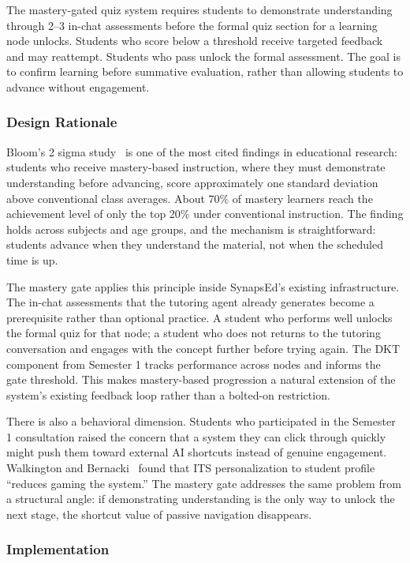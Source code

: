 \documentclass{stylefiles/capstone}
\begin{document}
The mastery-gated quiz system requires students to demonstrate understanding through 2--3 in-chat assessments before the formal quiz section for a learning node unlocks. Students who score below a threshold receive targeted feedback and may reattempt. Students who pass unlock the formal assessment. The goal is to confirm learning before summative evaluation, rather than allowing students to advance without engagement.

\subsubsection{Design Rationale}

Bloom's 2 sigma study~\cite{bloom1984sigma} is one of the most cited findings in educational research: students who receive mastery-based instruction, where they must demonstrate understanding before advancing, score approximately one standard deviation above conventional class averages. About 70\% of mastery learners reach the achievement level of only the top 20\% under conventional instruction. The finding holds across subjects and age groups, and the mechanism is straightforward: students advance when they understand the material, not when the scheduled time is up.

The mastery gate applies this principle inside SynapsEd's existing infrastructure. The in-chat assessments that the tutoring agent already generates become a prerequisite rather than optional practice. A student who performs well unlocks the formal quiz for that node; a student who does not returns to the tutoring conversation and engages with the concept further before trying again. The DKT component from Semester 1 tracks performance across nodes and informs the gate threshold. This makes mastery-based progression a natural extension of the system's existing feedback loop rather than a bolted-on restriction.

There is also a behavioral dimension. Students who participated in the Semester 1 consultation raised the concern that a system they can click through quickly might push them toward external AI shortcuts instead of genuine engagement. Walkington and Bernacki~\cite{walkington2019personalizing} found that ITS personalization to student profile ``reduces gaming the system.'' The mastery gate addresses the same problem from a structural angle: if demonstrating understanding is the only way to unlock the next stage, the shortcut value of passive navigation disappears.

\subsubsection{Implementation}
\end{document}

